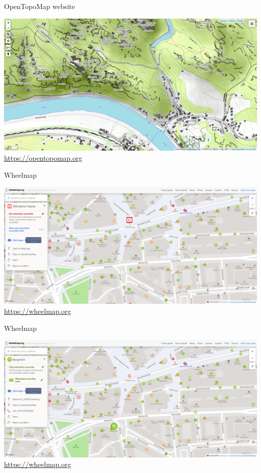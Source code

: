 \documentclass{beamer}
\begin{document}
	\begin{frame}{OpenTopoMap website}
		\begin{center}
			\includegraphics[height=0.7\textheight]{images/opentopomap-website}\\
			\url{https://opentopomap.org}
		\end{center}
	\end{frame}
	
	\begin{frame}{Wheelmap}
		\begin{center}
			\includegraphics[height=0.7\textheight]{images/wheelmap-website1}\\
			\url{https://wheelmap.org}
		\end{center}
	\end{frame}

	\begin{frame}{Wheelmap}
		\begin{center}
			\includegraphics[height=0.7\textheight]{images/wheelmap-website2}\\
			\url{https://wheelmap.org}
		\end{center}
	\end{frame}
	
\end{document}
